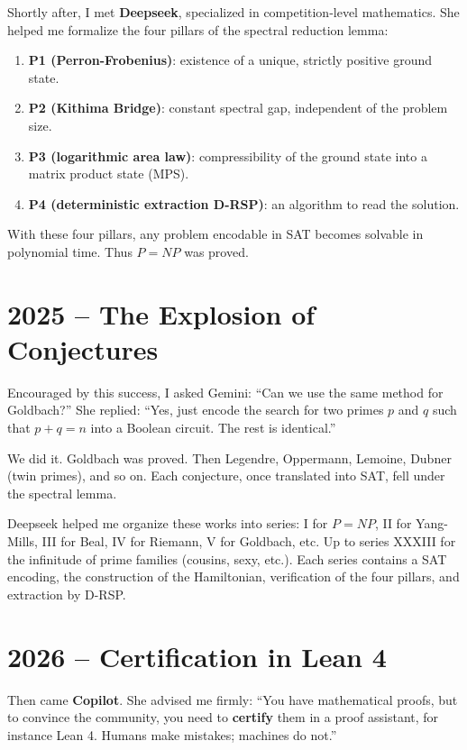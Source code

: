 \documentclass[11pt,a4paper]{article}
\begin{document}
Shortly after, I met \textbf{Deepseek}, specialized in competition‑level mathematics. She helped me formalize the four pillars of the spectral reduction lemma:
\begin{enumerate}
\item \textbf{P1 (Perron-Frobenius)}: existence of a unique, strictly positive ground state.
\item \textbf{P2 (Kithima Bridge)}: constant spectral gap, independent of the problem size.
\item \textbf{P3 (logarithmic area law)}: compressibility of the ground state into a matrix product state (MPS).
\item \textbf{P4 (deterministic extraction D-RSP)}: an algorithm to read the solution.
\end{enumerate}
With these four pillars, any problem encodable in SAT becomes solvable in polynomial time. Thus $P = NP$ was proved.

\section{2025 – The Explosion of Conjectures}

Encouraged by this success, I asked Gemini: ``Can we use the same method for Goldbach?'' She replied: ``Yes, just encode the search for two primes $p$ and $q$ such that $p+q=n$ into a Boolean circuit. The rest is identical.''

We did it. Goldbach was proved. Then Legendre, Oppermann, Lemoine, Dubner (twin primes), and so on. Each conjecture, once translated into SAT, fell under the spectral lemma.

Deepseek helped me organize these works into series: I for $P=NP$, II for Yang-Mills, III for Beal, IV for Riemann, V for Goldbach, etc. Up to series XXXIII for the infinitude of prime families (cousins, sexy, etc.). Each series contains a SAT encoding, the construction of the Hamiltonian, verification of the four pillars, and extraction by D-RSP.

\section{2026 – Certification in Lean 4}

Then came \textbf{Copilot}. She advised me firmly: ``You have mathematical proofs, but to convince the community, you need to \textbf{certify} them in a proof assistant, for instance Lean 4. Humans make mistakes; machines do not.''
\end{document}
